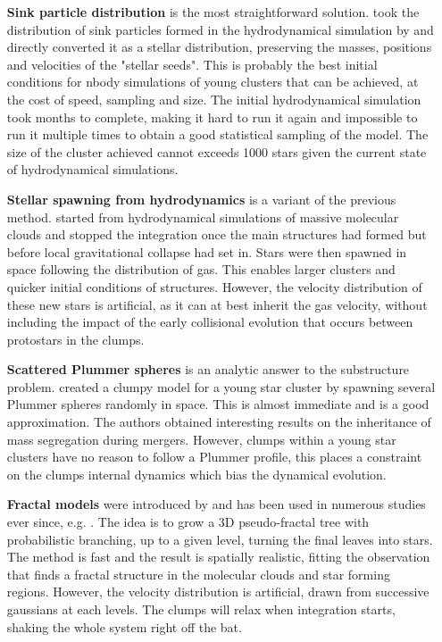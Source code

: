  
\begin{itemize}
\item[\textbf{Sink particle distribution}] is the most straightforward solution. \cite{Moeckel2010} took the distribution of sink particles formed in the hydrodynamical simulation by \cite{Bate2009} and directly converted it as a stellar distribution, preserving the masses, positions and velocities of the "stellar seeds". This is probably the best initial conditions for nbody simulations of young clusters that can be achieved, at the cost of speed, sampling and size. The initial hydrodynamical simulation took months to complete, making it hard to run it again and impossible to run it multiple times to obtain a good statistical sampling of the model. The size of the cluster achieved cannot exceeds 1000 stars given the current state of hydrodynamical simulations.

\item[\textbf{Stellar spawning from hydrodynamics}] is a variant of the previous method. \cite{Fujii2016} started from hydrodynamical simulations of massive molecular clouds and stopped the integration once the main structures had formed but before local gravitational collapse had set in. Stars were then spawned in space following the distribution of gas. This enables larger clusters and quicker initial conditions of structures. However, the velocity distribution of these new stars is artificial, as it can at best inherit the gas velocity, without including the impact of the early collisional evolution that occurs between protostars in the clumps.

\item[\textbf{Scattered Plummer spheres}] is an analytic answer to the substructure problem. \cite{McMillan2007} created a clumpy model for a young star cluster by spawning several Plummer spheres randomly in space. This is almost immediate and is a good approximation. The authors obtained interesting results on the inheritance of mass segregation during mergers. However, clumps within a young star clusters have no reason to follow a Plummer profile, this places a constraint on the clumps internal dynamics which bias the dynamical evolution.

\item[\textbf{Fractal models}] were introduced by \cite{Goodwin2004} and has been used in numerous studies ever since, e.g. \cite{Allison2009b,Kouwenhoven2010,Parker2016}. The idea is to grow a 3D pseudo-fractal tree with probabilistic branching, up to a given level, turning the final leaves into stars. The method is fast and the result is spatially realistic, fitting the observation that finds a fractal structure in the molecular clouds and star forming regions. However, the velocity distribution is artificial, drawn from successive gaussians at each levels. The clumps will relax when integration starts, shaking the whole system right off the bat.

\end{itemize}

